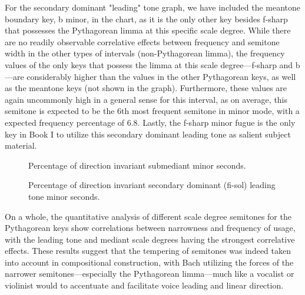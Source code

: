 For the secondary dominant "leading" tone graph, we have included the
meantone boundary key, b minor, in the chart, as it is the only other
key besides f-sharp that possesses the Pythagorean limma at this
specific scale degree. While there are no readily observable correlative
effects between frequency and semitone width in the other types of
intervals (non-Pythagorean limma), the frequency values of the only keys
that possess the limma at this scale degree---f-sharp and
b---are considerably higher than the values in the other Pythagorean
keys, as well as the meantone keys (not shown in the graph).
Furthermore, these values are again uncommonly high in a general sense
for this interval, as on average, this semitone is expected to be the
6th most frequent semitone in minor mode, with a expected frequency
percentage of 6.8. Lastly, the f-sharp minor fugue is the only key in
Book I to utilize this secondary dominant leading tone as salient
subject material.




\begin{figure}[H]
    \begin{center}
    \caption{Percentage of direction invariant submediant minor seconds. }
    \end{center}
\end{figure}
    



\begin{figure}[H]
    \begin{center}
    \caption{Percentage of direction invariant secondary dominant (fi-sol) leading tone minor seconds. }
    \end{center}
\end{figure}
    
    On a whole, the quantitative analysis of different scale degree
semitones for the Pythagorean keys show correlations between narrowness
and frequency of usage, with the leading tone and mediant scale degrees
having the strongest correlative effects. These results suggest that the
tempering of semitones was indeed taken into account in compositional
construction, with Bach utilizing the forces of the narrower
semitones---especially the Pythagorean limma---much like a
vocalist or violinist would to accentuate and facilitate voice leading
and linear direction.

